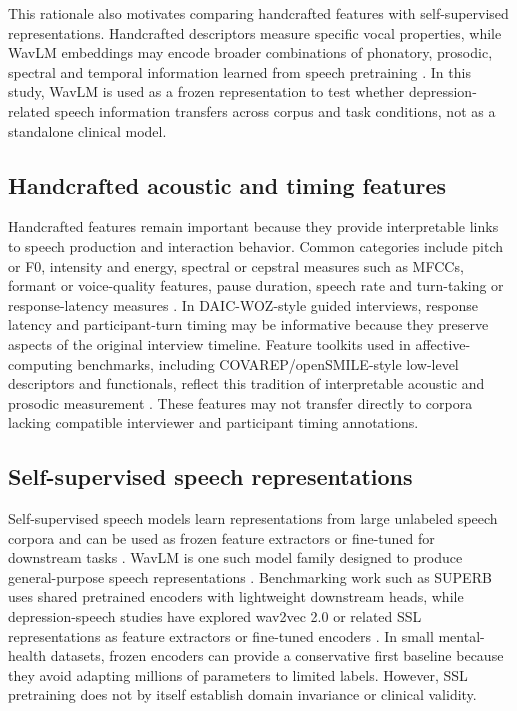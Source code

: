\documentclass[lettersize,journal]{IEEEtran}
\begin{document}
This rationale also motivates comparing handcrafted features with self-supervised representations. Handcrafted descriptors measure specific vocal properties, while WavLM embeddings may encode broader combinations of phonatory, prosodic, spectral and temporal information learned from speech pretraining \cite{chen2022wavlm,yang2021superb}. In this study, WavLM is used as a frozen representation to test whether depression-related speech information transfers across corpus and task conditions, not as a standalone clinical model.

\subsection{Handcrafted acoustic and timing features}

Handcrafted features remain important because they provide interpretable links to speech production and interaction behavior. Common categories include pitch or F0, intensity and energy, spectral or cepstral measures such as MFCCs, formant or voice-quality features, pause duration, speech rate and turn-taking or response-latency measures \cite{leal2025survey,valstar2016avec,tao2023featureCorrelation}. In DAIC-WOZ-style guided interviews, response latency and participant-turn timing may be informative because they preserve aspects of the original interview timeline. Feature toolkits used in affective-computing benchmarks, including COVAREP/openSMILE-style low-level descriptors and functionals, reflect this tradition of interpretable acoustic and prosodic measurement \cite{valstar2016avec,leal2025survey}. These features may not transfer directly to corpora lacking compatible interviewer and participant timing annotations.

\subsection{Self-supervised speech representations}

Self-supervised speech models learn representations from large unlabeled speech corpora and can be used as frozen feature extractors or fine-tuned for downstream tasks \cite{baevski2020wav2vec2,chen2022wavlm,yang2021superb}. WavLM is one such model family designed to produce general-purpose speech representations \cite{chen2022wavlm}. Benchmarking work such as SUPERB uses shared pretrained encoders with lightweight downstream heads, while depression-speech studies have explored wav2vec 2.0 or related SSL representations as feature extractors or fine-tuned encoders \cite{yang2021superb,wu2023sslDepression,huang2024voicePretraining}. In small mental-health datasets, frozen encoders can provide a conservative first baseline because they avoid adapting millions of parameters to limited labels. However, SSL pretraining does not by itself establish domain invariance or clinical validity.
\end{document}
